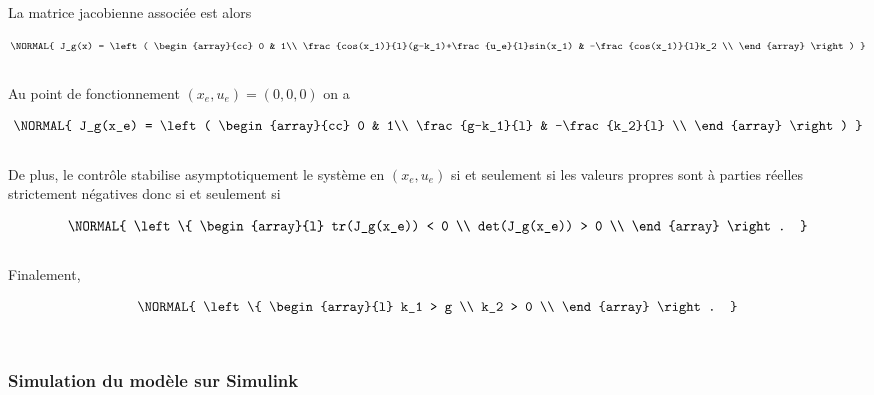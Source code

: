 \documentclass[11pt,french]{article} %
\begin{document}
La matrice jacobienne associée est alors 

\begin{equation}
	\NORMAL{
		J_g(x) = 
		\left(
		\begin{array}{cc}
			0 & 1\\
			\frac{cos(x_1)}{l}(g-k_1)+\frac{u_e}{l}sin(x_1) & -\frac{cos(x_1)}{l}k_2 \\
    \end{array}
  \right)
	}
\end{equation}\\

Au point de fonctionnement $(x_e,u_e) = (0,0,0)$ on a 

\begin{equation}
	\NORMAL{
		J_g(x_e) = 
		\left(
		\begin{array}{cc}
			0 & 1\\
			\frac{g-k_1}{l} & -\frac{k_2}{l} \\
    \end{array}
  \right)
	}
\end{equation}\\

De plus, le contrôle stabilise asymptotiquement le système en $(x_e,u_e)$ si et seulement si les valeurs propres sont à parties réelles strictement négatives donc si et seulement si

\begin{equation}
	\NORMAL{
  \left\{
    \begin{array}{l}
			tr(J_g(x_e)) < 0 \\
			det(J_g(x_e)) > 0 \\
    \end{array}
  \right.
	}
\end{equation}\\

Finalement,

\begin{equation}
	\NORMAL{
  \left\{
    \begin{array}{l}
			k_1 > g \\
			k_2 > 0 \\
    \end{array}
  \right.
	}
\end{equation}\\

\subsubsection{Simulation du modèle sur Simulink} 
\end{document}
